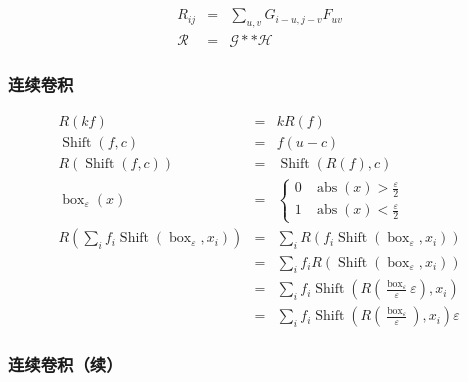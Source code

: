 \documentclass{beamer}
\newcommand{\nospace}{}
\newcommand{\tmop}[1]{\ensuremath{\operatorname{#1}}}
\begin{document}
{{\begin{frame}
\begin{eqnarray*}
\begin{array}{lll}
    \end{array}\\
    R_{i \nospace j} & = & \sum_{u, v} G_{i - u, j - v} F_{u \nospace v}\\
    \mathcal{R} & = & \mathcal{G} \ast \ast \mathcal{H}
  \end{eqnarray*}
\end{frame}}{\begin{frame}
  \frametitle{连续卷积}
  \begin{eqnarray*}
    R (k \nospace f) & = & k \nospace R (f)\\
    \tmop{Shift} (f, c) & = & f (u - c)\\
    R (\tmop{Shift} (f, c)) & = & \tmop{Shift} (R (f), c)\\
    \tmop{box}_{\varepsilon} (x) & = & \left\{\begin{array}{ll}
      0 & \tmop{abs} (x) > \frac{\varepsilon}{2}\\
      1 & \tmop{abs} (x) < \frac{\varepsilon}{2}
    \end{array}\right.\\
    R \left( \sum_i f_i \tmop{Shift} (\tmop{box}_{\varepsilon}, x_i) \right) &
    = & \sum_i R (f_i \tmop{Shift} (\tmop{box}_{\varepsilon}, x_i))\\
    & = & \sum_i f_i R (\tmop{Shift} (\tmop{box}_{\varepsilon}, x_i))\\
    & = & \sum_i f_i \tmop{Shift} \left( R \left(
    \frac{\tmop{box}_{\varepsilon}}{\varepsilon} \varepsilon \right), x_i
    \right)\\
    & = & \sum_i f_i \tmop{Shift} \left( R \left(
    \frac{\tmop{box}_{\varepsilon}}{\varepsilon} \right), x_i \right)
    \varepsilon
  \end{eqnarray*}
\end{frame}}{\begin{frame}
  \frametitle{连续卷积（续）}
  

\end{frame}}}
\end{document}

